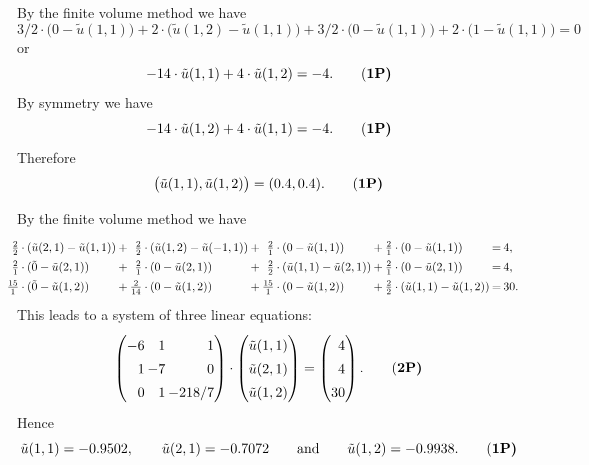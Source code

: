 \begin{loesung}
\begin{teilaufgaben}
\item
By the finite volume method we have
\[
3/2 \cdot \big(0 - \tilde u(1,1)\big)
+
2 \cdot \big(\tilde u(1,2) - \tilde u(1,1)\big)
+
3/2 \cdot \big( 0 - \tilde u(1,1)) +  2 \cdot (1 - \tilde u(1,1)\big)
=
0
\]
or
\begin{equation}
-14 \cdot \tilde u(1,1) + 4 \cdot \tilde u(1,2) = -4.
\tag{\bf{1P}}
\end{equation}
By symmetry we have
\begin{equation}
-14 \cdot \tilde u(1,2) + 4 \cdot \tilde u(1,1) = -4.
\tag{\bf{1P}}
\end{equation}
Therefore
\begin{equation}
\big(\tilde u(1,1), \tilde u(1,2)\big) = (0.4, 0.4).
\tag{\bf{1P}}
\end{equation}
\item
By the finite volume method we have
\[
\renewcommand{\arraycolsep}{1pt}
\renewcommand{\arraystretch}{1.4}
\hspace*{-10pt}
\begin{array}{rclcrclcrclcrclcl}
\frac{2}{2}&\cdot&(\tilde u(2,1) - \tilde u(1,1))
&+&
\frac{2}{2}&\cdot&(\tilde u(1,2)  - \tilde u(-1,1))
&+&
\frac{2}{1}&\cdot&(0 - \tilde u(1,1))
&+&
\frac{2}{1}&\cdot&(0 - \tilde u(1,1))
&=&
4,
\\
\frac{2}{1}&\cdot&(\tilde 0 - \tilde u(2,1))
&+&
\frac{2}{1}&\cdot&(0  - \tilde u(2,1))
&+&
\frac{2}{2}&\cdot&(\tilde u(1,1)- \tilde u(2,1))
&+&
\frac{2}{1}&\cdot&(0 - \tilde u(2,1))
&=&
4,
\\
\frac{15}{1}&\cdot&(\tilde 0 - \tilde u(1,2))
&+&
\frac{2}{14}&\cdot&(0  - \tilde u(1,2))
&+&
\frac{15}{1}&\cdot&(0 - \tilde u(1,2))
&+&
\frac{2}{2}&\cdot&(\tilde u(1,1)- \tilde u(1,2))
&=&
30.
\end{array}
\]
This leads to a system of three linear equations:
\begin{equation}
\begin{pmatrix*}[r] -6 & 1 & 1 \\ 1 & -7 & 0 \\  0 & 1 &  -218/7 \end{pmatrix*}
\cdot
\begin{pmatrix} \tilde u(1,1) \\ \tilde u(2,1) \\ \tilde u(1,2) \end{pmatrix}
=
\begin{pmatrix*}[r] 4  \\  4 \\  30 \end{pmatrix*}.
\tag{\bf{2P}}
\end{equation}
Hence
\begin{equation}
\tilde u(1,1) = -0.9502,\qquad \tilde u(2,1) = -0.7072
\qquad\text{and}\qquad
\tilde u(1,2) = -0.9938.
\tag{\bf{1P}}
\end{equation}
\end{teilaufgaben}
\end{loesung}
